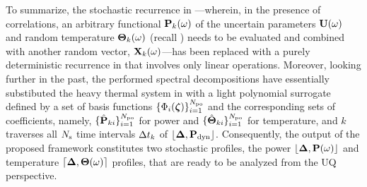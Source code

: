 To summarize, the stochastic recurrence in ---wherein, in the presence of correlations, an arbitrary functional $\mathbf{P}_k(\omega)$ of the uncertain parameters $\mathbf{U}(\omega)$ and random temperature ${\boldsymbol\Theta}_k(\omega)$ (recall ) needs to be evaluated and combined with another random vector, $\mathbf{X}_k(\omega)$---has been replaced with a purely deterministic recurrence in  that involves only linear operations. Moreover, looking further in the past, the performed spectral decompositions have essentially substibuted the heavy thermal system in  with a light polynomial surrogate defined by a set of basis functions $\{ \Phi_i(\boldsymbol{\zeta}) \}_{i = 1}^{{N_\text{po}}}$ and the corresponding sets of coefficients, namely, $\{ \hat{\mathbf{P}}_{ki} \}_{i = 1}^{{N_\text{po}}}$ for power and $\{ \hat{{\boldsymbol\Theta}}_{ki} \}_{i = 1}^{{N_\text{po}}}$ for temperature, and $k$ traverses all $N_\text{s}$ time intervals $\Delta t_k$ of $\profPdyn$. Consequently, the output of the proposed framework constitutes two stochastic profiles, the power $\profP{\o}$ and temperature $\profT{\o}$ profiles, that are ready to be analyzed from the UQ perspective.
